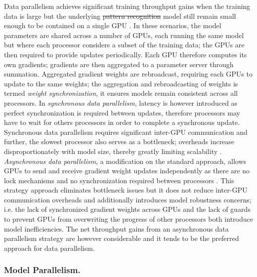 \documentclass[10pt]{article}[draft]
\begin{document}
 Data parallelism achieves significant training throughput gains  when the training data is large but the underlying \st{pattern recognition} model still remain small enough to be contained on a single GPU \cite{(Krizhevsky, 2014)}. In these scenarios, the model parameters are shared across a number of  GPUs, each running the same model but where each processor considers a subset of the training data; the GPUs are then required to provide  updates periodically. Each GPU therefore computes  its own gradients;  gradients are then aggregated to a parameter server through summation.  Aggregated gradient weights are  rebroadcast, requiring each GPUs to update to the same  weights; the aggregation and rebroadcasting of weights is termed \emph{weight synchronization}, it ensures models remain consistent across all processors.  In \emph{synchronous data parallelism}, latency is however introduced as  perfect synchronization is required between updates, therefore processors may  have to wait for others processors in order to complete a synchronous  update. Synchronous data parallelism requires significant inter-GPU communication and further, the slowest processor also serves as a bottleneck;  overheads increase disproportionately with model size, thereby greatly limiting scalability \cite{(Seide et al., 2014; Strom, 2015; Alistarh et al., 2016; Zhou et al., 2016; Aji & Heafield, 2017; Lin et al., 2017}.  \emph{Asynchronous data parallelism}, a modification on the standard approach, allows GPUs to send and receive gradient weight updates independently as there are no lock mechanisms and no synchronization required between processors \cite{J. Dean et al. Large scale distributed deep networks. NIPS Conference, 2012}. This strategy approach eliminates bottleneck issues but it does not reduce inter-GPU communication overheads and additionally introduces model robustness concerns; i.e. the lack of synchronized gradient weights across GPUs and the lack of guards to prevent GPUs from overwriting the progress of other processors  both introduce model inefficiencies. The net throughput gains from an asynchronous data parallelism strategy are however considerable and it tends to be the preferred approach for {data parallelism}.
 
 \subsubsection{Model Parallelism.}
 
\end{document}
